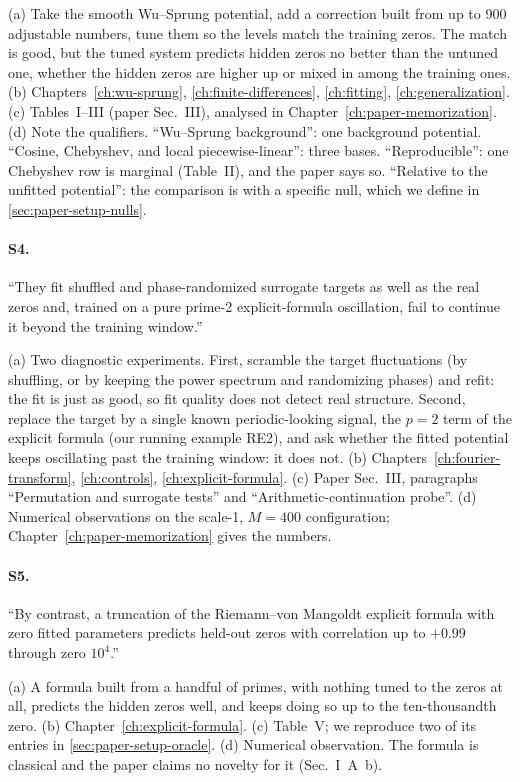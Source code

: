 (a) Take the smooth Wu--Sprung potential, add a correction built from up to 900 adjustable numbers, tune them so the levels match the training zeros. The match is good, but the tuned system predicts hidden zeros no better than the untuned one, whether the hidden zeros are higher up or mixed in among the training ones. (b) Chapters~\ref{ch:wu-sprung}, \ref{ch:finite-differences}, \ref{ch:fitting}, \ref{ch:generalization}. (c) Tables~I--III (paper Sec.~III), analysed in Chapter~\ref{ch:paper-memorization}. (d) Note the qualifiers. ``Wu--Sprung background'': one background potential. ``Cosine, Chebyshev, and local piecewise-linear'': three bases. ``Reproducible'': one Chebyshev row is marginal (Table~II), and the paper says so. ``Relative to the unfitted potential'': the comparison is with a specific null, which we define in \cref{sec:paper-setup-nulls}.

\paragraph{S4.} ``They fit shuffled and phase-randomized surrogate targets as well as the real zeros and, trained on a pure prime-2 explicit-formula oscillation, fail to continue it beyond the training window.''

(a) Two diagnostic experiments. First, scramble the target fluctuations (by shuffling, or by keeping the power spectrum and randomizing phases) and refit: the fit is just as good, so fit quality does not detect real structure. Second, replace the target by a single known periodic-looking signal, the $p=2$ term of the explicit formula (our running example RE2), and ask whether the fitted potential keeps oscillating past the training window: it does not. (b) Chapters~\ref{ch:fourier-transform}, \ref{ch:controls}, \ref{ch:explicit-formula}. (c) Paper Sec.~III, paragraphs ``Permutation and surrogate tests'' and ``Arithmetic-continuation probe''. (d) Numerical observations on the scale-1, $M=400$ configuration; Chapter~\ref{ch:paper-memorization} gives the numbers.

\paragraph{S5.} ``By contrast, a truncation of the Riemann--von Mangoldt explicit formula with zero fitted parameters predicts held-out zeros with correlation up to $+0.99$ through zero $10^4$.''

(a) A formula built from a handful of primes, with nothing tuned to the zeros at all, predicts the hidden zeros well, and keeps doing so up to the ten-thousandth zero. (b) Chapter~\ref{ch:explicit-formula}. (c) Table~V; we reproduce two of its entries in \cref{sec:paper-setup-oracle}. (d) Numerical observation. The formula is classical and the paper claims no novelty for it (Sec.~I~A~b).

